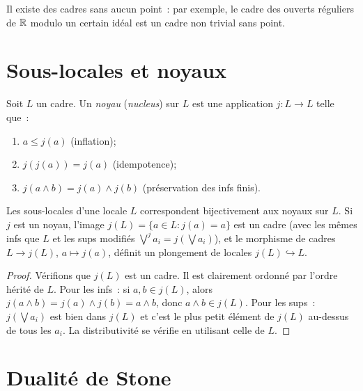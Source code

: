 \begin{proposition}
Il existe des cadres sans aucun point~: par exemple, le cadre des ouverts r\'eguliers
de $\mathbb{R}$ modulo un certain id\'eal est un cadre non trivial sans point.
\end{proposition}

\section{Sous-locales et noyaux}

\begin{definition}[Noyau]
Soit $L$ un cadre. Un \emph{noyau} (\emph{nucleus}) sur $L$ est une application
$j\colon L \to L$ telle que~:
\begin{enumerate}
  \item $a \leq j(a)$ (inflation);
  \item $j(j(a)) = j(a)$ (idempotence);
  \item $j(a \wedge b) = j(a) \wedge j(b)$ (pr\'eservation des infs finis).
\end{enumerate}
\end{definition}

\begin{theoreme}
Les sous-locales d'une locale $L$ correspondent bijectivement aux noyaux sur $L$. Si $j$
est un noyau, l'image $j(L) = \{a \in L : j(a) = a\}$ est un cadre (avec les m\^emes
infs que $L$ et les sups modifi\'es $\bigvee^j a_i = j(\bigvee a_i)$), et le morphisme
de cadres $L \to j(L)$, $a \mapsto j(a)$, d\'efinit un plongement de locales
$j(L) \hookrightarrow L$.
\end{theoreme}

\begin{proof}
V\'erifions que $j(L)$ est un cadre. Il est clairement ordonn\'e par l'ordre h\'erit\'e de
$L$. Pour les infs~: si $a, b \in j(L)$, alors $j(a \wedge b) = j(a) \wedge j(b) =
a \wedge b$, donc $a \wedge b \in j(L)$. Pour les sups~: $j(\bigvee a_i)$ est bien dans
$j(L)$ et c'est le plus petit \'el\'ement de $j(L)$ au-dessus de tous les $a_i$.
La distributivit\'e se v\'erifie en utilisant celle de $L$.
\end{proof}

\section{Dualit\'e de Stone}

